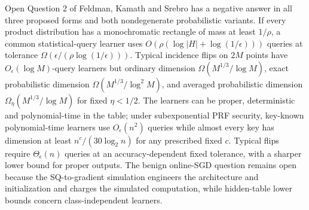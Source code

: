Open Question 2 of Feldman, Kamath and Srebro has a negative answer in all three proposed forms and both nondegenerate probabilistic variants. If every product distribution has a monochromatic rectangle of mass at least $1/\rho$, a common statistical-query learner uses $O(\rho(\log|H|+\log(1/\epsilon)))$ queries at tolerance $\Omega(\epsilon/(\rho\log(1/\epsilon)))$. Typical incidence flips on $2M$ points have $O_\epsilon(\log M)$-query learners but ordinary dimension $\Omega(M^{1/3}/\log M)$, exact probabilistic dimension $\Omega(M^{1/3}/\log^2M)$, and averaged probabilistic dimension $\Omega_\eta(M^{1/3}/\log M)$ for fixed $\eta<1/2$. The learners can be proper, deterministic and polynomial-time in the table; under subexponential PRF security, key-known polynomial-time learners use $O_\epsilon(n^2)$ queries while almost every key has dimension at least $n^c/(30\log_2n)$ for any prescribed fixed $c$. Typical flips require $\Theta_\epsilon(n)$ queries at an accuracy-dependent fixed tolerance, with a sharper lower bound for proper outputs. The benign online-SGD question remains open because the SQ-to-gradient simulation engineers the architecture and initialization and charges the simulated computation, while hidden-table lower bounds concern class-independent learners.
